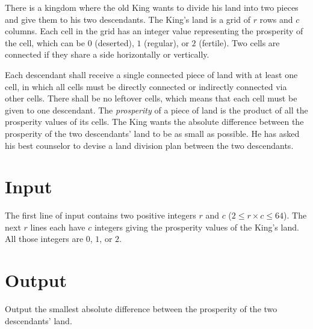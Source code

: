 
There is a kingdom where the old King wants to divide his land into two pieces and give them to his two descendants.
The King's land is a grid of $r$ rows and $c$ columns.
Each cell in the grid has an integer value representing the prosperity of the cell, which can be $0$ (deserted), $1$ (regular), or $2$ (fertile).
Two cells are connected if they share a side horizontally or vertically.

Each descendant shall receive a single connected piece of land with at least one cell, in which all cells must be directly connected or indirectly connected via other cells.
There shall be no leftover cells, which means that each cell must be given to one descendant.
The {\it prosperity} of a piece of land is the product of all the prosperity values of its cells.
The King wants the absolute difference between the prosperity of the two descendants' land to be as small as possible.
He has asked his best counselor to devise a land division plan between the two descendants.

\section*{Input}
The first line of input contains two positive integers $r$ and $c$ ($2 \leq r \times c \leq 64$).
The next $r$ lines each have $c$ integers giving the prosperity values of the King's land.
All those integers are $0$, $1$, or $2$.

\section*{Output}
Output the smallest absolute difference between the prosperity of the two descendants' land.
